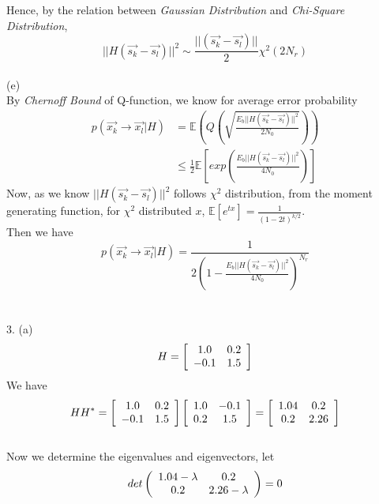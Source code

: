 \documentclass [12pt] {article}
\begin{document}
\begin{spacing}{1.5}
Hence, by the relation between \emph{Gaussian Distribution} and \emph{Chi-Square Distribution}, $$||H( \vec{s_k} - \vec{s_l} )|| ^2 \sim \frac{||( \vec{s_k} - \vec{s_l} )||}{2} \chi^2(2 N_r)$$
~\\
(e) \\
By \emph{Chernoff Bound} of Q-function, we know for average error probability
\begin{align*}
p(\vec{x_k} \to \vec{x_l} | H) &= \mathbb{E}(Q(\sqrt{\frac{E_b  ||H( \vec{s_k} - \vec{s_l} )|| ^2}{2N_0}}))\\
&\leq \frac{1}{2} \mathbb{E}[exp(\frac{E_b  ||H( \vec{s_k} - \vec{s_l} )|| ^2}{4 N_0})]
\end{align*}
Now, as we know $ ||H( \vec{s_k} - \vec{s_l} )|| ^2$ follows $\chi^2$ distribution, from the moment generating function, for $\chi^2$ distributed $x$, $\mathbb{E}[e^{tx}] = \frac{1}{(1-2t)^{k/2}}$.\\
Then we have 
$$p(\vec{x_k} \to \vec{x_l} | H) = \frac{1}{2(1-\frac{E_b ||H( \vec{s_k} - \vec{s_l} )|| ^2}{4 N_0})^{N_r}} $$
~\\
~\\
3. (a)\\
$$H = 
\left[ {\begin{array}{*{20}c}
   1.0 & 0.2  \\
   -0.1 & 1.5  \\
 \end{array} } \right]
$$
We have 
$$HH^* = 
\left[ {\begin{array}{*{20}c}
   1.0 & 0.2  \\
   -0.1 & 1.5  \\
 \end{array} } \right]\left[ {\begin{array}{*{20}c}
   1.0 & -0.1  \\
   0.2 & 1.5  \\
 \end{array} } \right] = 
 \left[ {\begin{array}{*{20}c}
   1.04 & 0.2  \\
   0.2 & 2.26  \\
 \end{array} } \right]
$$
~\\
Now we determine the eigenvalues and eigenvectors, let
$$ det\left( {\begin{array}{*{20}c}
   1.04 - \lambda & 0.2  \\
   0.2 & 2.26 -\lambda  \\
 \end{array} } \right) = 0$$

\end{spacing}
\end{document}
